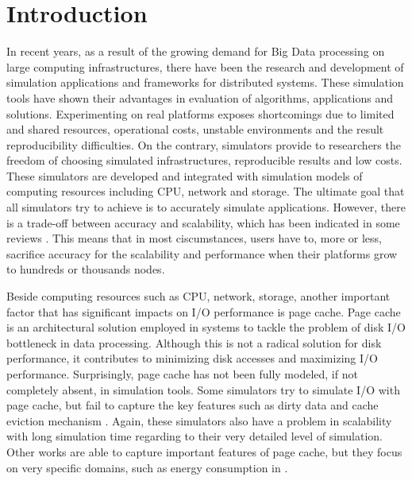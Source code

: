 \documentclass[conference]{IEEEtran}
\begin{document}
	\section{Introduction}
		
		In recent years, as a result of the growing demand for Big Data processing 
		on large computing infrastructures, there have been the research and development 
		of simulation applications and frameworks for distributed systems. 
		These simulation tools have shown their advantages in evaluation 
		of algorithms, applications and solutions. 
		Experimenting on real platforms exposes shortcomings due to limited and 
		shared resources, operational costs, unstable environments and the result 
		reproducibility difficulties.
		On the contrary, simulators provide to researchers the freedom of choosing 
		simulated infrastructures, reproducible results and low costs.
		These simulators are developed and integrated with simulation models 
		of computing resources including CPU, network and storage.
		The ultimate goal that all simulators try to achieve is to accurately simulate 
		applications. 
		However, there is a trade-off between accuracy and scalability, which has been 
		indicated in some reviews \cite{casanova2014simgrid} \cite{byrne2017review}. 
		This means that in most ciscumstances, users have to, more or less, sacrifice 
		accuracy for the scalability and performance when their platforms grow to 
		hundreds or thousands nodes. 
		
		Beside computing resources such as CPU, network, storage, another 
		important factor that has significant impacts on I/O performance is 
		page cache. 
		Page cache is an architectural solution employed in systems to tackle 
		the problem of disk I/O bottleneck in data processing. 
		Although this is not a radical solution for disk performance, it contributes 
		to minimizing disk accesses and maximizing I/O performance. 
		Surprisingly, page cache has not been fully modeled, if not completely absent, 
		in simulation tools. 
		Some simulators try to simulate I/O with page cache, but fail to capture the 
		key features such as dirty data and cache eviction mechanism 
		\cite{nunez2012simcan} \cite{nunez2012icancloud}.
		Again, these simulators also have a problem in scalability with 
		long simulation time regarding to their very detailed level of simulation. 
		Other works are able to capture important features of page cache, 
		but they focus on very specific domains, such as energy consumption 
		in \cite{xu2018saving}.
\end{document}
